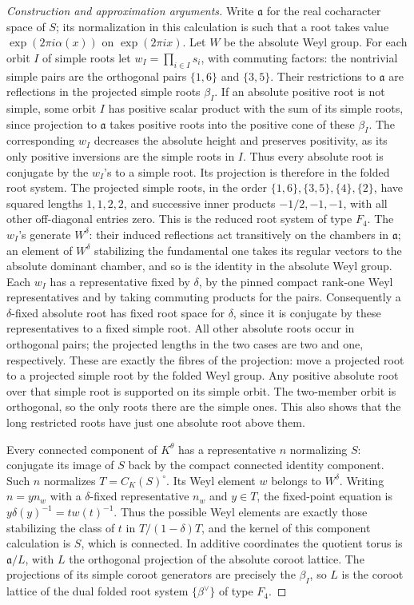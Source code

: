 \documentclass[11pt,a4paper,openany,oneside]{book}
\theoremstyle{resultstyle}
\theoremstyle{definition}
\numberwithin{equation}{chapter}
\begin{document}
\begin{proof}[Construction and approximation arguments]
Write \(\mathfrak a\) for the real cocharacter space of \(S\);
its normalization in this calculation is such that a root takes
value \(\exp(2\pi i\alpha(x))\) on \(\exp(2\pi i x)\).
Let \(W\) be the absolute Weyl group. For each orbit \(I\) of
simple roots let \(w_I=\prod_{i\in I}s_i\), with commuting
factors: the nontrivial simple pairs are the orthogonal
pairs \(\{1,6\}\) and \(\{3,5\}\). Their restrictions to
\(\mathfrak a\) are reflections in the projected simple roots
\(\beta_I\). If an absolute positive root is not simple,
some orbit \(I\) has positive scalar product with the sum
of its simple roots, since projection to \(\mathfrak a\)
takes positive roots into the positive cone of these
\(\beta_I\). The corresponding \(w_I\) decreases the absolute
height and preserves positivity, as its only positive inversions
are the simple roots in \(I\). Thus every absolute root is
conjugate by the \(w_I\)'s to a simple root. Its projection
is therefore in the folded root system. The projected simple
roots, in the order \(\{1,6\},\{3,5\},\{4\},\{2\}\), have
squared lengths \(1,1,2,2\), and successive inner products
\(-1/2,-1,-1\), with all other off-diagonal entries zero.
This is the reduced root system of type \(F_4\).
The \(w_I\)'s generate \(W^\delta\): their induced reflections
act transitively on the chambers in \(\mathfrak a\); an
element of \(W^\delta\) stabilizing the fundamental one takes
its regular vectors to the absolute dominant chamber, and
so is the identity in the absolute Weyl group.
Each \(w_I\) has a representative fixed by \(\delta\), by
the pinned compact rank-one Weyl representatives and by
taking commuting products for the pairs. Consequently a
\(\delta\)-fixed absolute root has fixed root space for
\(\delta\), since it is conjugate by these representatives
to a fixed simple root. All other absolute roots occur
in orthogonal pairs; the projected lengths in the two
cases are two and one, respectively. These are exactly the fibres
of the projection: move a projected root to a projected simple root
by the folded Weyl group. Any positive absolute root over that
simple root is supported on its simple orbit. The two-member
orbit is orthogonal, so the only roots there are the simple
ones. This also shows that the long restricted roots have just
one absolute root above them.

Every connected component of \(K^\theta\) has a representative
\(n\) normalizing \(S\): conjugate its image of \(S\) back by
the compact connected identity component. Such \(n\) normalizes
\(T=C_K(S)^\circ\). Its Weyl element \(w\) belongs to \(W^\delta\).
Writing \(n=y n_w\) with a \(\delta\)-fixed representative \(n_w\)
and \(y\in T\), the fixed-point equation is
\(y\delta(y)^{-1}=t w(t)^{-1}\). Thus the possible Weyl elements
are exactly those stabilizing the class of \(t\) in
\(T/(1-\delta)T\), and the kernel of this component calculation is
\(S\), which is connected. In additive coordinates the quotient
torus is \(\mathfrak a/L\), with \(L\) the orthogonal projection
of the absolute coroot lattice. The projections of its simple
coroot generators are precisely the \(\beta_I\), so \(L\) is
the coroot lattice of the dual folded root system
\(\{\beta^\vee\}\) of type \(F_4\).


\end{proof}
\end{document}
